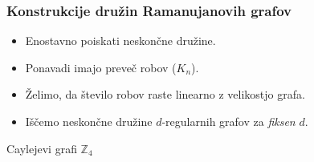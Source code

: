 \documentclass{beamer}
\begin{document}
\begin{frame}
    \frametitle{Konstrukcije družin Ramanujanovih grafov}
    \begin{itemize}
        \item Enostavno poiskati neskončne družine.
        \item Ponavadi imajo preveč robov (\(K_n\)). \pause
        \item Želimo, da število robov raste linearno z velikostjo grafa.
        \item Iščemo neskončne družine \(d\)-regularnih grafov za \emph{fiksen} \(d\).
    \end{itemize}
\end{frame}
\begin{frame}{Caylejevi grafi \(\mathbb Z_4\)}
\end{frame}
\end{document}
